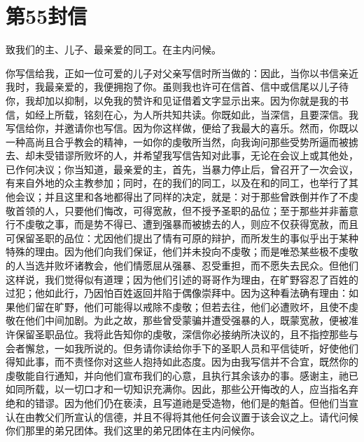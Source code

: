 

\section{第55封信}

\par

致我们的主、儿子、最亲爱的同工。在主内问候。\par

你写信给我，正如一位可爱的儿子对父亲写信时所当做的：因此，当你以书信亲近我时，我最亲爱的，我便拥抱了你。虽则我也许可在信首、信中或信尾以儿子待你，我却加以抑制，以免我的赞许和见证借着文字显示出来。因为你就是我的书信，如经上所载，铭刻在心，为人所共知共读。你既如此，当深信，且要深信。我写信给你，并邀请你也写信。因为你这样做，便给了我最大的喜乐。然而，你既以一种高尚且合乎教会的精神，一如你的虔敬所当然，向我询问那些受势所逼而被掳去、却未受错谬所败坏的人，并希望我写信告知对此事，无论在会议上或其他处，已作何决议；你当知道，最亲爱的主，首先，当暴力停止后，曾召开了一次会议，有来自外地的众主教参加；同时，在的我们的同工，以及在和的同工，也举行了其他会议；并且这里和各地都得出了同样的决定，就是：对于那些曾跌倒并作了不虔敬首领的人，只要他们悔改，可得宽赦，但不授予圣职的品位；至于那些并非蓄意行不虔敬之事，而是势不得已、遭到强暴而被掳去的人，则应不仅获得宽赦，而且可保留圣职的品位：尤因他们提出了情有可原的辩护，而所发生的事似乎出于某种特殊的理由。因为他们向我们保证，他们并未投向不虔敬；而是唯恐某些极不虔敬的人当选并败坏诸教会，他们情愿屈从强暴、忍受重担，而不愿失去民众。但他们这样说，我们觉得似有道理；因为他们引述的哥哥作为理由，在旷野容忍了百姓的过犯；他如此行，乃因怕百姓返回并陷于偶像崇拜中。因为这种看法确有理由：如果他们留在旷野，他们可能得以戒除不虔敬；但若去往，他们必遭败坏，且使不虔敬在他们中间加剧。为此之故，那些曾受蒙骗并遭受强暴的人，既蒙宽赦，便被准许保留圣职品位。我将此告知你的虔敬，深信你必接纳所决议的，且不指控那些与会者懈怠，一如我所说的。但务请你读给你手下的圣职人员和平信徒听，好使他们得知此事，而不责怪你对这些人抱持如此态度。因为由我写信并不合宜，既然你的虔敬能自行通知，并向他们宣布我们的心意，且执行其余该办的事。感谢主，祂已如同所载，以一切口才和一切知识充满你。因此，那些公开悔改的人，应当指名弃绝和的错谬。因为他们仍在亵渎，且写道祂是受造物，他们是的魁首。但他们当宣认在由教父们所宣认的信德，并且不得将其他任何会议置于该会议之上。请代问候你们那里的弟兄团体。我们这里的弟兄团体在主内问候你。\par

